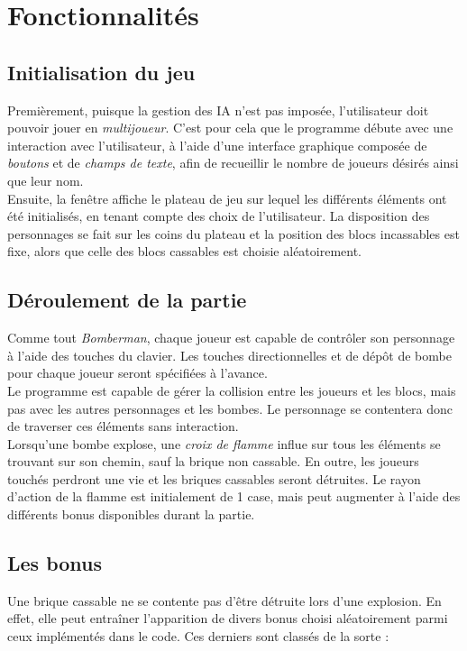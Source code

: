 \section{Fonctionnalités}
\subsection{Initialisation du jeu}
Premièrement, puisque la gestion des IA n'est pas imposée, l'utilisateur doit pouvoir jouer en \textit{multijoueur}. C'est pour cela que le programme débute avec une interaction avec l'utilisateur, à l'aide d'une interface graphique composée de \textit{boutons} et de \textit{champs de texte}, afin de recueillir le nombre de joueurs désirés ainsi que leur nom. \\
Ensuite, la fenêtre affiche le plateau de jeu sur lequel les différents éléments ont été initialisés, en tenant compte des choix de l'utilisateur. La disposition des personnages se fait sur les coins du plateau et la position des blocs incassables est fixe, alors que celle des blocs cassables est choisie aléatoirement. 

\subsection{Déroulement de la partie}
Comme tout \textit{Bomberman}, chaque joueur est capable de contrôler son personnage à l'aide des touches du clavier. Les touches directionnelles et de dépôt de bombe pour chaque joueur seront spécifiées à l'avance. \\
Le programme est capable de gérer la collision entre les joueurs et les blocs, mais pas avec les autres personnages et les bombes. Le personnage se contentera donc de traverser ces éléments sans interaction. \\
Lorsqu'une bombe explose, une \textit{croix de flamme} influe sur tous les éléments se trouvant sur son chemin, sauf la brique non cassable. En outre, les joueurs touchés perdront une vie et les briques cassables seront détruites. Le rayon d'action de la flamme est initialement de 1 case, mais peut augmenter à l'aide des différents bonus disponibles durant la partie. 

\subsection{Les bonus}
Une brique cassable ne se contente pas d'être détruite lors d'une explosion. En effet, elle peut entraîner l'apparition de divers bonus choisi aléatoirement parmi ceux implémentés dans le code. Ces derniers sont classés de la sorte : 

